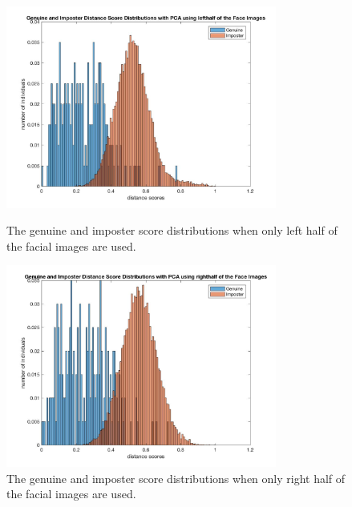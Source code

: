 \documentclass[a4paper]{article}
\begin{document}
\begin{spacing}{2.0}
	\begin{figure}[h!]
	\begin{minipage}[t]{0.5\linewidth}
	\centering
	\includegraphics[width = 3.5in]{pcaleftscoreDis.jpg}
	\caption{The genuine and imposter score distributions when only left half of the facial images are used.}
	\label{scoreDisLeftPCA}
	\end{minipage}
	\begin{minipage}[t]{0.5\linewidth}
	\centering
	\includegraphics[width = 3.5in]{pcarightscoreDis.jpg}
	\caption{The genuine and imposter score distributions when only right half of the facial images are used.}
	\label{scoreDisRightPCA}
	\end{minipage}
	\end{figure}
	

\end{spacing}
\end{document}
